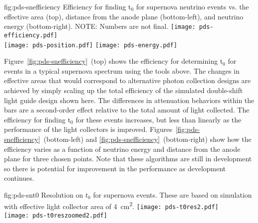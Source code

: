 \begin{dunefigure}{fig:pds-snefficiency}
{Efficiency for finding t$_0$ for supernova neutrino events vs. the effective area (top), distance from the anode plane (bottom-left), and neutrino energy (bottom-right). NOTE: Numbers are not final.}
  \texttt{[image: pds-efficiency.pdf]}\\
  \texttt{[image: pds-position.pdf]}
  \texttt{[image: pds-energy.pdf]}
\end{dunefigure}

Figure~\ref{fig:pds-snefficiency}~(top) shows the efficiency for determining t$_0$ for events in a typical supernova spectrum using the tools above. The changes in effective areas that would correspond to alternative photon collection designs are achieved by simply scaling up the total efficiency of the simulated double-shift light guide design shown here. The differences in attenuation behaviors within the bars are a second-order effect relative to the total amount of light collected. The efficiency for finding t$_0$ for these events increases, but less than linearly as the performance of the light collectors is improved. Figures~\ref{fig:pds-snefficiency}~(bottom-left) and \ref{fig:pds-snefficiency}~(bottom-right) show how the efficiency varies as a function of neutrino energy and distance from the anode plane for three chosen points. Note that these algorithms are still in development so there is potential for improvement in the performance as development continues.

\begin{dunefigure}{fig:pds-snt0}
{Resolution on $t_0$ for supernova events. These are based on simulation with effective light collector area of \SI{4}{cm^2}.}
  \texttt{[image: pds-t0res2.pdf]}\\
  \texttt{[image: pds-t0reszoomed2.pdf]}
\end{dunefigure}

